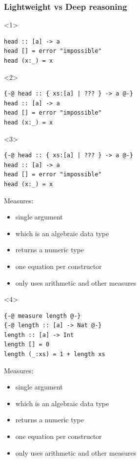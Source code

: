 \documentclass{beamer}
\begin{document}
\begin{frame}[fragile]
\frametitle{Lightweight vs Deep reasoning}

\begin{onlyenv}<1>
\begin{verbatim}
head :: [a] -> a
head [] = error "impossible"
head (x:_) = x
\end{verbatim}
\end{onlyenv}

\begin{onlyenv}<2>
\begin{verbatim}
{-@ head :: { xs:[a] | ??? } -> a @-}
head :: [a] -> a
head [] = error "impossible"
head (x:_) = x
\end{verbatim}
\end{onlyenv}

\begin{onlyenv}<3>
\begin{verbatim}
{-@ head :: { xs:[a] | ??? } -> a @-}
head :: [a] -> a
head [] = error "impossible"
head (x:_) = x
\end{verbatim}

\vspace{10pt}
Measures:
\begin{itemize}
\item{single argument}
\item{which is an algebraic data type}
\item{returns a numeric type}
\item{one equation per constructor}
\item{only uses arithmetic and other measures}
\end{itemize}
\end{onlyenv}

\begin{onlyenv}<4>
\begin{verbatim}
{-@ measure length @-}
{-@ length :: [a] -> Nat @-}
length :: [a] -> Int
length [] = 0
length (_:xs) = 1 + length xs
\end{verbatim}

\vspace{10pt}

Measures:
\begin{itemize}
\item{single argument}
\item{which is an algebraic data type}
\item{returns a numeric type}
\item{one equation per constructor}
\item{only uses arithmetic and other measures}
\end{itemize}


\end{onlyenv}
\end{frame}
\end{document}
